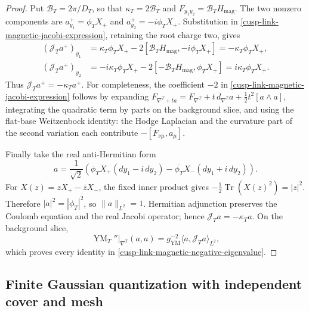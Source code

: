 \documentclass[11pt]{article}
\theoremstyle{definition}
\numberwithin{equation}{section}
\begin{document}
\begin{proof}
Put \(\mathcal B_T=2\pi/D_T\), so that
\(\kappa_T=2\mathcal B_T\) and
\(F_{y_1y_2}=\mathcal B_TH_{\mathrm{mag}}\).  The two nonzero components are
\(a_{y_1}^+=\phi_TX_+\) and \(a_{y_2}^+=-i\phi_TX_+\).  Substitution in
\eqref{cusp-link-magnetic-jacobi-expression}, retaining the root charge two,
gives
\begin{align*}
 (\mathcal J_Ta^+)_{y_1}
 &=\kappa_T\phi_TX_+
   -2[\mathcal B_TH_{\mathrm{mag}},-i\phi_TX_+]
  =-\kappa_T\phi_TX_+,\\
 (\mathcal J_Ta^+)_{y_2}
 &=-i\kappa_T\phi_TX_+
   -2[-\mathcal B_TH_{\mathrm{mag}},\phi_TX_+]
  =i\kappa_T\phi_TX_+.
\end{align*}
Thus \(\mathcal J_Ta^+=-\kappa_Ta^+\).  For completeness, the coefficient
\(-2\) in \eqref{cusp-link-magnetic-jacobi-expression} follows by expanding
\(F_{\nabla^T+ta}=F_{\nabla^T}+t\,d_{\nabla^T}a+
\tfrac12t^2[a\wedge a]\), integrating the quadratic term by parts on the
background slice, and using the flat-base Weitzenbock identity: the Hodge
Laplacian and the curvature part of the second variation each contribute
\(-[F_{\nu\mu},a_\mu]\).

Finally take the real anti-Hermitian form
\begin{equation}
 a=\frac1{\sqrt2}\left(
   \phi_TX_+(dy_1-i\,dy_2)
   -\overline{\phi_T}X_-(dy_1+i\,dy_2)\right).
 \label{cusp-link-magnetic-real-mode}
\end{equation}
For \(X(z)=zX_+-\overline zX_-\), the fixed inner product gives
\(-\tfrac12\operatorname{Tr}(X(z)^2)=|z|^2\).  Therefore
\(|a|^2=|\phi_T|^2\), so \(\|a\|_{L^2}=1\).  Hermitian adjunction preserves
the Coulomb equation and the real Jacobi operator; hence
\(\mathcal J_Ta=-\kappa_Ta\).  On the background slice,
\[
 \operatorname{YM}_T''|_{\nabla^T}(a,a)
 =g_{\mathrm{YM}}^{-2}\langle a,\mathcal J_Ta\rangle_{L^2},
\]
which proves every identity in
\eqref{cusp-link-magnetic-negative-eigenvalue}.
\end{proof}

\subsection{Finite Gaussian quantization with independent cover and mesh}
\end{document}
